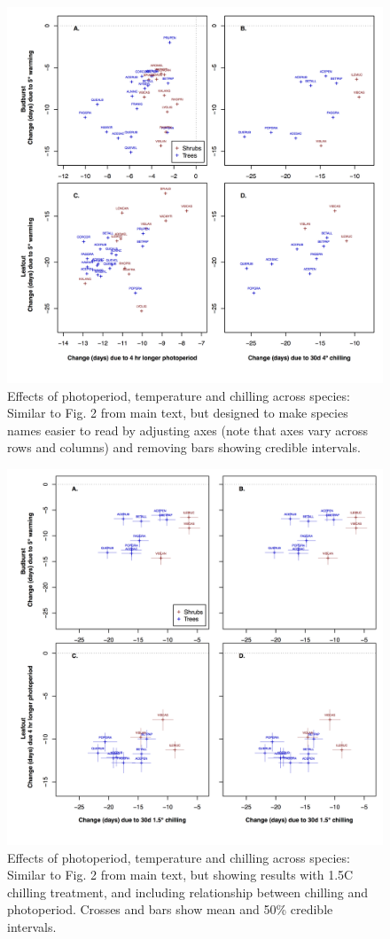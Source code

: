 \documentclass{article}
\begin{document}
\begin{figure}
\label{figS5}
\includegraphics[width=1\textwidth]{Fig2_4panel_ZoomSupp.png}
\caption{Effects of photoperiod, temperature and chilling across species: Similar to Fig. 2 from main text, but designed to make species names easier to read by adjusting axes (note that axes vary across rows and columns) and removing bars showing credible intervals. }
\end{figure}


\begin{figure}
\label{figS6}
\includegraphics[width=1\textwidth]{FigChill2_4panel.png}
\caption{Effects of photoperiod, temperature and chilling across species: Similar to Fig. 2 from main text, but showing results with 1.5\degree C chilling treatment, and including relationship between chilling and photoperiod. Crosses and bars show mean and 50\% credible intervals.}
\end{figure}
\end{document}
